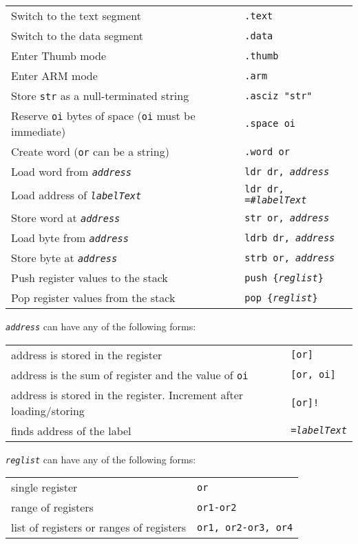 \documentclass{article}
\begin{document}
\hspace*{2em}\begin{tabular}{ll}
Switch to the text segment & {\tt .text} \\
Switch to the data segment & {\tt .data} \\
Enter Thumb mode & {\tt .thumb} \\
Enter ARM mode & {\tt .arm} \\
Store {\tt str} as a null-terminated string & {\tt .asciz "str"} \\
Reserve {\tt oi} bytes of space ({\tt oi} must be immediate) \hspace{2em} & {\tt .space oi} \\
Create word ({\tt or} can be a string) & {\tt .word or} \\
Load word from {\tt \em address} & {\tt ldr dr, {\em address}} \\
Load address of {\tt \em labelText} & {\tt ldr dr, =\#{\em labelText}} \\
Store word at {\tt \em address} & {\tt str or, {\em address}} \\
Load byte from {\tt \em address} & {\tt ldrb dr, {\em address}} \\
Store byte at {\tt \em address} & {\tt strb or, {\em address}} \\
Push register values to the stack & {\tt push \{{\em reglist}\} } \\
Pop register values from the stack & {\tt pop \{{\em reglist}\}} \\
\end{tabular}

\vspace{0.5em}
{\tt\em address} can have any of the following forms:

\hspace*{4em}\begin{tabular}{ll}
address is stored in the register & {\tt [or]} \\
address is the sum of  register and the value of {\tt oi} & {\tt \verb-[or, oi]-} \\
address is stored in the register. Increment after loading/storing & {\tt \verb-[or]!-} \\
finds address of the label & {\tt ={\em labelText}} \\
\end{tabular}

{\tt\em reglist} can have any of the following forms:

\hspace*{4em}\begin{tabular}{ll}
single register & {\tt or} \\
range of registers & {\tt or1-or2} \\  
list of registers or ranges of registers & {\tt or1, or2-or3, or4} \\
\end{tabular}
\end{document}
